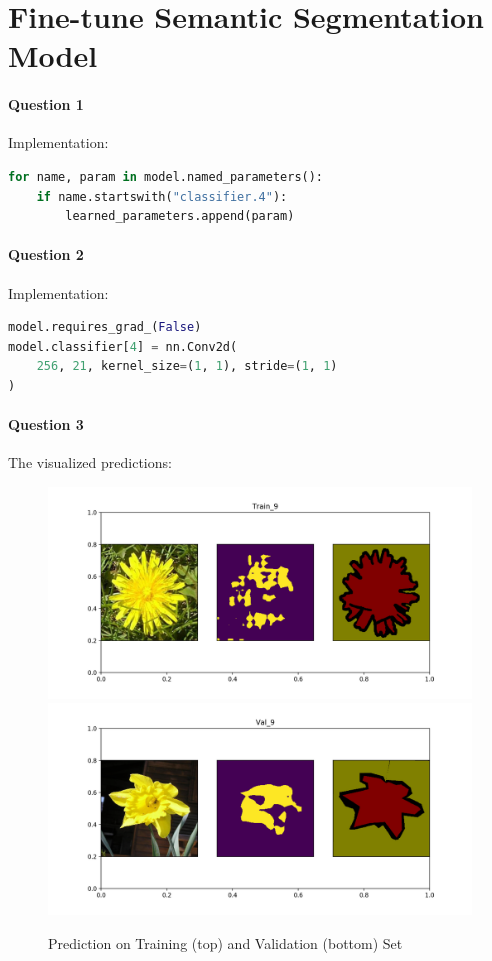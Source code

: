 \documentclass[12pt]{article}
\begin{document}
	\section{Fine-tune Semantic Segmentation Model}
	\paragraph{Question 1} Implementation:
	\begin{lstlisting}[language=python]
for name, param in model.named_parameters():
    if name.startswith("classifier.4"):
        learned_parameters.append(param)
	\end{lstlisting}
	\paragraph{Question 2} Implementation:
	\begin{lstlisting}[language=python]
model.requires_grad_(False)
model.classifier[4] = nn.Conv2d(
	256, 21, kernel_size=(1, 1), stride=(1, 1)
)
	\end{lstlisting}
	
	\paragraph{Question 3} The visualized predictions:
	\begin{figure}[H]
		\centering
		\caption{Prediction on Training (top) and Validation (bottom) Set}
		\includegraphics[width=\linewidth]{figures/c3_train_9.png}
		\includegraphics[width=\linewidth]{figures/c3_val_9.png}
	\end{figure}
\end{document}
